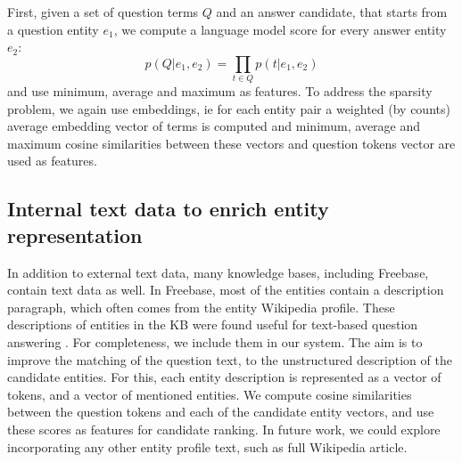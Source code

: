 First, given a set of question terms $Q$ and an answer candidate, that starts from a question entity $e_1$, we compute a language model score for every answer entity $e_2$:
$$p(Q|e_1, e_2) = \prod_{t\in Q} p(t | e_1, e_2)$$
and use minimum, average and maximum as features.
To address the sparsity problem, we again use embeddings, 
ie for each entity pair a weighted (by counts) average embedding vector of terms is computed and minimum, average and maximum cosine similarities between these vectors and question tokens vector are used as features.

\subsection{Internal text data to enrich entity representation}
In addition to external text data, many knowledge bases, including Freebase, contain text data as well.
In Freebase, most of the entities contain a description paragraph, which often comes from the entity Wikipedia profile.
These descriptions of entities in the KB were found useful for text-based question answering \cite{Sun:2015:ODQ:2736277.2741651}.
For completeness, we include them in our system. The aim is to improve the matching of the question text, to the unstructured description of the candidate entities. For this, each entity description is represented as a vector of tokens, and a vector of mentioned entities. We compute cosine similarities between the question tokens and each of the candidate entity vectors, and use these scores as features for candidate ranking.
In future work, we could explore incorporating any other entity profile text, such as full Wikipedia article.



